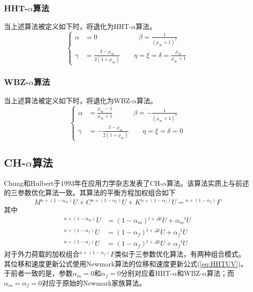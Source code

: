 \subsubsection{HHT-$\alpha$算法}
当上述算法被定义如下时，将退化为HHT-$\alpha$算法。
\begin{equation}
\left\{\begin{aligned}
\alpha&=0\qquad\qquad\qquad\beta=\frac{1}{(\rho_{\infty}+1)^2}\\
\gamma&=\frac{3-\rho_{\infty}}{2(1+\rho_{\infty})}\qquad\eta=\xi=\delta=\frac{\rho_{\infty}}{\rho_{\infty}+1}
\end{aligned}\right.
\end{equation}

\subsubsection{WBZ-$\alpha$算法}
当上述算法被定义如下时，将退化为WBZ-$\alpha$算法。
\begin{equation}
\left\{\begin{aligned}
\alpha&=\frac{\rho_{\infty}-1}{\rho_{\infty}+1}\quad\qquad\beta=-\frac{1}{(\rho_{\infty}+1)^2}\\
\gamma&=-\frac{3-\rho_{\infty}}{2(1+\rho_{\infty})}\qquad\eta=\xi=\delta=0
\end{aligned}\right.
\end{equation}

\subsection{CH-$\alpha$算法}
Chung和Hulbert于1993年在应用力学杂志发表了CH-$\alpha$算法\cite{Chung1993}。该算法实质上与前述的三参数优化算法一致。其算法的平衡方程加权组合如下
\begin{equation}
M{^{n+(1-\alpha_m)}\!\ddot{U}}+C{^{n+(1-\alpha_f)}\!\dot{U}}+K{^{n+(1-\alpha_f)}\!U}={^{n+(1-\alpha_f)}\!F}
\end{equation}
其中
\begin{subequations}
\begin{align}
{^{n+(1-\alpha_m)}\!\ddot{U}}&=(1-\alpha_m){^{t+\Delta t}\!\ddot{U}}+\alpha_m{^t\!\ddot{U}}\\
{^{n+(1-\alpha_f)}\!\dot{U}}&=(1-\alpha_f){^{t+\Delta t}\!\dot{U}}+\alpha_f{^t\!\dot{U}}\\
{^{n+(1-\alpha_f)}\!{U}}&=(1-\alpha_f){^{t+\Delta t}\!{U}}+\alpha_f{^t\!{U}}
\end{align}
\end{subequations}
对于外力荷载的加权组合${^{n+(1-\alpha_f)}\!F}$类似于三参数优化算法，有两种组合模式。其位移和速度更新公式使用Newmark算法的位移和速度更新公式(\ref{eq:HHTUV})。于前者一致的是，参数$\alpha_m=0$和$\alpha_f=0$分别对应着HHT-$\alpha$和WBZ-$\alpha$算法；而$\alpha_m=\alpha_f=0$对应于原始的Newmark家族算法。

